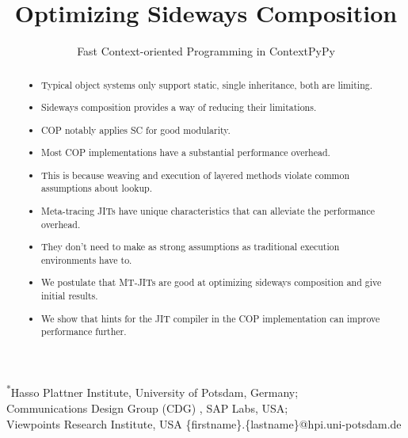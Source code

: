 \documentclass[preprint,english,10pt,nonatbib]{sigplanconf}
\begin{document}



\title{Optimizing Sideways Composition}
\subtitle{Fast Context-oriented Programming in ContextPyPy}

           {\textsuperscript{*}Hasso Plattner Institute, University of Potsdam, Germany;\\
           \textsuperscript{\textdagger}Communications Design Group (CDG) , SAP Labs, USA; \\
           \textsuperscript{\textdagger}Viewpoints Research Institute, USA}
           {\{firstname\}.\{lastname\}@hpi.uni-potsdam.de}

\maketitle

\begin{abstract}
  \begin{itemize}
  \item Typical object systems only support static, single inheritance, both
    are limiting.
  \item Sideways composition provides a way of reducing their limitations.
  \item COP notably applies SC for good modularity.
  \item Most COP implementations have a substantial performance overhead.
  \item This is because weaving and execution of layered methods violate common
    assumptions about lookup.
  \item Meta-tracing JITs have unique characteristics that can alleviate the
    performance overhead.
  \item They don't need to make as strong assumptions as traditional execution
    environments have to.
  \item We postulate that MT-JITs are good at optimizing sideways composition
    and give initial results.
  \item We show that hints for the JIT compiler in the COP implementation can
    improve performance further.
  \end{itemize}
\end{abstract}
\end{document}
